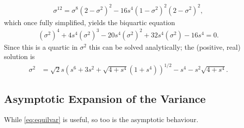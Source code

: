\begin{align*}
\sigma^{12} = \sigma^8 (2 - \sigma^2)^2 - 16s^4 (1 - \sigma^2)^2 (2 - \sigma^2)^2,
\end{align*}
which once fully simplified, yields the biquartic equation
\begin{align}
\label{eq:var}
\left( \sigma^2 \right)^4 + 4 s^4 \left( \sigma^2 \right)^3 - 20 s^4 \left( \sigma^2 \right)^2 + 32 s^4 \left( \sigma^2 \right) - 16 s^4 = 0.
\end{align}
Since this is a quartic in $\sigma^2$ this can be solved analytically; the (positive, real) solution is
\begin{align}
\label{eq:equilvar}
\sigma^2 &= \sqrt{2} s \left( s^6 + 3s^2 + \sqrt{4 + s^4} \left( 1 + s^4 \right) \right)^{1/2} - s^4 - s^2 \sqrt{4 + s^4}.
\end{align}

\subsection{Asymptotic Expansion of the Variance}
While \eqref{eq:equilvar} is useful, so too is the asymptotic behaviour.




